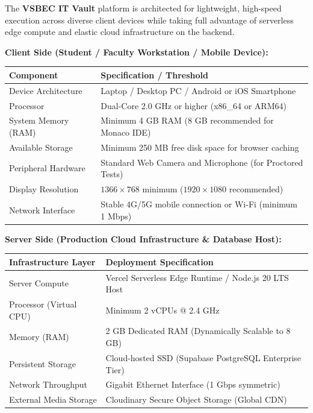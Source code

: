 {\fontsize{12pt}{17.5pt}\selectfont
The \textbf{VSBEC IT Vault} platform is architected for lightweight, high-speed execution across diverse client devices while taking full advantage of serverless edge compute and elastic cloud infrastructure on the backend.

\noindent\textbf{Client Side (Student / Faculty Workstation / Mobile Device):}
\begin{table}[H]
  \centering
  \fontsize{11pt}{15.5pt}\selectfont
  \begin{tabularx}{\textwidth}{@{}p{5.5cm} L@{}}
    \textbf{Component} & \textbf{Specification / Threshold} \\
    \midrule
    Device Architecture & Laptop / Desktop PC / Android or iOS Smartphone \\
    Processor & Dual-Core 2.0 GHz or higher (x86\_64 or ARM64) \\
    System Memory (RAM) & Minimum 4 GB RAM (8 GB recommended for Monaco IDE) \\
    Available Storage & Minimum 250 MB free disk space for browser caching \\
    Peripheral Hardware & Standard Web Camera and Microphone (for Proctored Tests) \\
    Display Resolution & $1366 \times 768$ minimum ($1920 \times 1080$ recommended) \\
    Network Interface & Stable 4G/5G mobile connection or Wi-Fi (minimum 1 Mbps) \\
    \bottomrule
  \end{tabularx}
\end{table}

\vspace{0.2cm}
\noindent\textbf{Server Side (Production Cloud Infrastructure \& Database Host):}
\begin{table}[H]
  \centering
  \fontsize{11pt}{15.5pt}\selectfont
  \begin{tabularx}{\textwidth}{@{}p{5.5cm} L@{}}
    \textbf{Infrastructure Layer} & \textbf{Deployment Specification} \\
    \midrule
    Server Compute & Vercel Serverless Edge Runtime / Node.js 20 LTS Host \\
    Processor (Virtual CPU) & Minimum 2 vCPUs @ 2.4 GHz \\
    Memory (RAM) & 2 GB Dedicated RAM (Dynamically Scalable to 8 GB) \\
    Persistent Storage & Cloud-hosted SSD (Supabase PostgreSQL Enterprise Tier) \\
    Network Throughput & Gigabit Ethernet Interface (1 Gbps symmetric) \\
    External Media Storage & Cloudinary Secure Object Storage (Global CDN) \\
    \bottomrule
  \end{tabularx}
\end{table}

}
